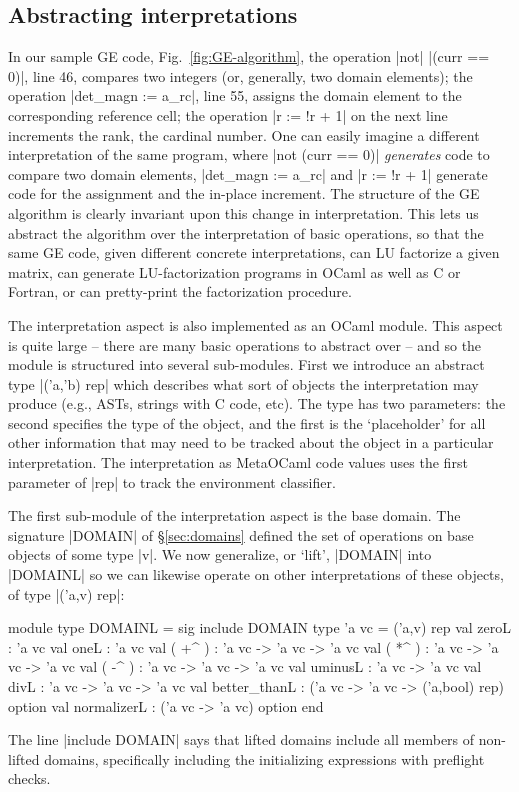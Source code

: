 \documentclass{elsart}
\begin{document}
\subsection{Abstracting interpretations}\label{sec:lifteddomains}

In our sample GE code, Fig.~\ref{fig:GE-algorithm}, the operation |not|
|(curr == 0)|, line 46, compares two integers (or, generally, two
domain elements); the operation |det_magn := a_rc|, line 55, assigns
the domain element to the corresponding reference cell; the operation
|r := !r + 1| on the next line increments the rank, the cardinal
number. One can easily imagine a different interpretation of the same
program, where |not (curr == 0)| \emph{generates} code to compare two
domain elements, |det_magn := a_rc| and |r := !r + 1| generate code
for the assignment and the in-place increment. The structure of the GE
algorithm is clearly invariant upon this change in
interpretation. This lets us abstract the algorithm over the
interpretation of basic operations, so that the same GE code, given
different concrete interpretations, can LU factorize a given matrix,
can generate LU-factorization programs in OCaml as well as C or Fortran, or can
pretty-print the factorization procedure.

The interpretation aspect is also implemented as an OCaml module.  This
aspect is quite large -- there are many basic operations to abstract
over -- and so the module is structured into several
sub-modules. First we introduce an abstract type |('a,'b) rep| which
describes what sort of objects the interpretation may produce (e.g.,
ASTs, strings with C code, etc). The type has two parameters: the
second specifies the type of the object, and the first is the
`placeholder' for all other information that may need to be tracked
about the object in a particular interpretation. The interpretation as
MetaOCaml code values uses the first parameter of |rep| to track the
environment classifier.

The first sub-module of the interpretation aspect is the base
domain. The signature |DOMAIN| of \S\ref{sec:domains} defined the set
of operations on base objects of some type |v|. We now
generalize, or `lift', |DOMAIN| into |DOMAINL| so we can likewise
operate on other interpretations of these objects, of type |('a,v) rep|:
\begin{code}
module type DOMAINL = sig
  include DOMAIN
  type 'a vc = ('a,v) rep
  val zeroL : 'a vc
  val oneL  : 'a vc
  val ( +^ ) : 'a vc -> 'a vc -> 'a vc
  val ( *^ ) : 'a vc -> 'a vc -> 'a vc
  val ( -^ ) : 'a vc -> 'a vc -> 'a vc
  val uminusL : 'a vc -> 'a vc
  val divL    : 'a vc -> 'a vc -> 'a vc
  val better_thanL : ('a vc -> 'a vc -> ('a,bool) rep) option
  val normalizerL  : ('a vc -> 'a vc) option
end 
\end{code}
The line |include DOMAIN| says that lifted domains include all members
of non-lifted domains, specifically including the initializing
expressions with preflight checks.
\end{document}
